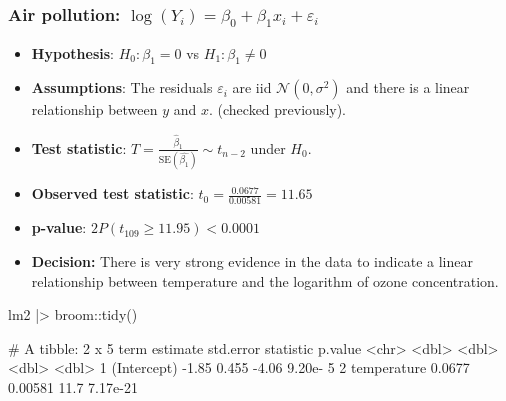 \documentclass[a4paper]{article}\usepackage[]{graphicx}\usepackage[]{xcolor}
\begin{document}
\subsubsection{Air pollution: \( \log(Y_i) = \beta_0 + \beta_1 x_i + \varepsilon_i \)}
\begin{itemize}
	\item \textbf{Hypothesis}: \( H_0: \beta_1=0 \) vs \( H_1: \beta_1 \neq 0 \)
	\item \textbf{Assumptions}: The residuals \( \varepsilon_i \) are iid \( \mathcal{N}(0,\sigma^2) \) and there is a linear relationship between \( y \) and \( x \). (checked previously).
	\item \textbf{Test statistic}: \( T = \frac{\hat{\beta}_1}{\text{SE}(\hat{\beta_1})} \sim t_{n-2} \) under \( H_0 \).
	\item \textbf{Observed test statistic}: \( t_0 = \frac{0.0677}{0.00581} = 11.65 \)
	\item \textbf{p-value}: \( 2P(t_{109}\geq 11.95) < 0.0001 \) 
	\item \textbf{Decision:} There is very strong evidence in the data to indicate a linear relationship between temperature and the logarithm of ozone concentration.
\end{itemize}
\begin{Schunk}
\begin{Sinput}
lm2 |> broom::tidy()
\end{Sinput}
\begin{Soutput}
# A tibble: 2 x 5
  term        estimate std.error statistic  p.value
  <chr>          <dbl>     <dbl>     <dbl>    <dbl>
1 (Intercept)  -1.85     0.455       -4.06 9.20e- 5
2 temperature   0.0677   0.00581     11.7  7.17e-21
\end{Soutput}
\end{Schunk}
\end{document}
